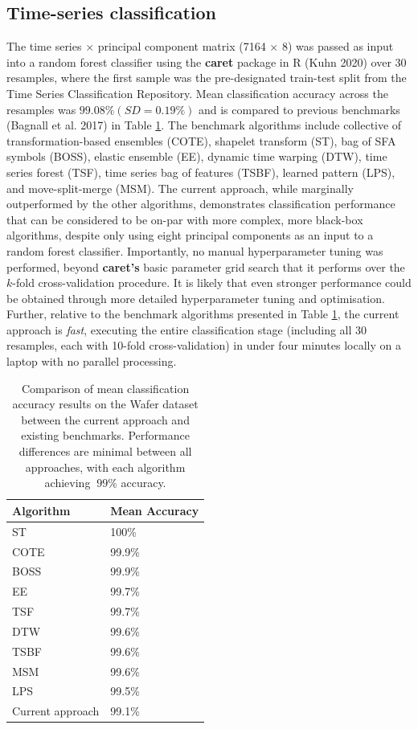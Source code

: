 \documentclass{article}
\begin{document}
\hypertarget{time-series-classification}{%
\subsection{Time-series classification}\label{time-series-classification}}

The time series \(\times\) principal component matrix (7164 \(\times\) 8) was passed as input into a random forest classifier using the \textbf{caret} package in R (Kuhn 2020) over 30 resamples, where the first sample was the pre-designated train-test split from the Time Series Classification Repository. Mean classification accuracy across the resamples was \(99.08\% (SD=0.19\%)\) and is compared to previous benchmarks (Bagnall et al. 2017) in Table \ref{tab:comptable}. The benchmark algorithms include collective of transformation-based ensembles (COTE), shapelet transform (ST), bag of SFA symbols (BOSS), elastic ensemble (EE), dynamic time warping (DTW), time series forest (TSF), time series bag of features (TSBF), learned pattern (LPS), and move-split-merge (MSM). The current approach, while marginally outperformed by the other algorithms, demonstrates classification performance that can be considered to be on-par with more complex, more black-box algorithms, despite only using eight principal components as an input to a random forest classifier. Importantly, no manual hyperparameter tuning was performed, beyond \textbf{caret's} basic parameter grid search that it performs over the \(k\)-fold cross-validation procedure. It is likely that even stronger performance could be obtained through more detailed hyperparameter tuning and optimisation. Further, relative to the benchmark algorithms presented in Table \ref{tab:comptable}, the current approach is \emph{fast}, executing the entire classification stage (including all 30 resamples, each with 10-fold cross-validation) in under four minutes locally on a laptop with no parallel processing.

\begin{table}

\caption{\label{tab:comptable}Comparison of mean classification accuracy results on the Wafer dataset between the current approach and existing benchmarks. Performance differences are minimal between all approaches, with each algorithm achieving $\>99\%$ accuracy.}
\centering
\begin{tabular}[t]{l|l}
\hline
Algorithm & Mean Accuracy\\
\hline
ST & 100\%\\
\hline
COTE & 99.9\%\\
\hline
BOSS & 99.9\%\\
\hline
EE & 99.7\%\\
\hline
TSF & 99.7\%\\
\hline
DTW & 99.6\%\\
\hline
TSBF & 99.6\%\\
\hline
MSM & 99.6\%\\
\hline
LPS & 99.5\%\\
\hline
Current approach & 99.1\%\\
\hline
\end{tabular}
\end{table}
\end{document}
